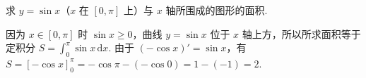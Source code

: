 \begin{problem}
求 \( y=\sin x \)（\( x \) 在 \( [0,\pi] \) 上）与 \( x \) 轴所围成的图形的面积.

\end{problem}

\begin{solution}
因为 \(x\in[0,\pi]\) 时 \(\sin x\geqslant0\)，曲线 \(y=\sin x\) 位于 \(x\) 轴上方，所以所求面积等于定积分
\(S=\int_0^\pi\sin x\,\mathrm{d}x\). 由于 \((-\cos x)'=\sin x\)，有
\(S=\left[-\cos x\right]_0^{\pi}=-\cos\pi-(-\cos0)=1-(-1)=2\).
\end{solution}
